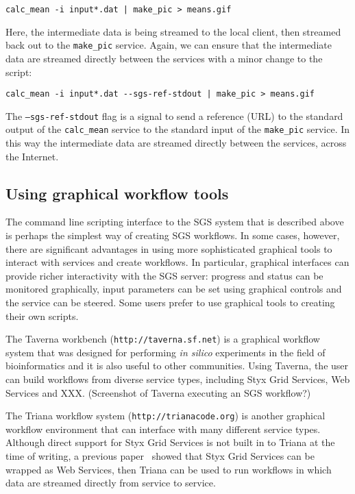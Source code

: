 \documentclass{llncs}
\begin{document}
\begin{verbatim}
calc_mean -i input*.dat | make_pic > means.gif
\end{verbatim}

Here, the intermediate data is being streamed to the local client, then streamed back out to the {\tt make\_pic} service.  Again, we can ensure that the intermediate data are streamed directly between the services with a minor change to the script:

\begin{verbatim}
calc_mean -i input*.dat --sgs-ref-stdout | make_pic > means.gif
\end{verbatim}

The {\tt ---sgs-ref-stdout} flag is a signal to send a reference (URL) to the standard output of the {\tt calc\_mean} service to the standard input of the {\tt make\_pic} service.  In this way the intermediate data are streamed directly between the services, across the Internet.

\subsection{Using graphical workflow tools}
The command line scripting interface to the SGS system that is described above is perhaps the simplest way of creating SGS workflows.  In some cases, however, there are significant advantages in using more sophisticated graphical tools to interact with services and create workflows.  In particular, graphical interfaces can provide richer interactivity with the SGS server: progress and status can be monitored graphically, input parameters can be set using graphical controls and the service can be steered.  Some users prefer to use graphical tools to creating their own scripts.

The Taverna workbench ({\tt http://taverna.sf.net}) is a graphical workflow system that was designed for performing {\it in silico} experiments in the field of bioinformatics and it is also useful to other communities.  Using Taverna, the user can build workflows from diverse service types, including Styx Grid Services, Web Services and XXX.  (Screenshot of Taverna executing an SGS workflow?)

The Triana workflow system ({\tt http://trianacode.org}) is another graphical workflow environment that can interface with many different service types.  Although direct support for Styx Grid Services is not built in to Triana at the time of writing, a previous paper~\cite{blower:2005} showed that Styx Grid Services can be wrapped as Web Services, then Triana can be used to run workflows in which data are streamed directly from service to service.
\end{document}
